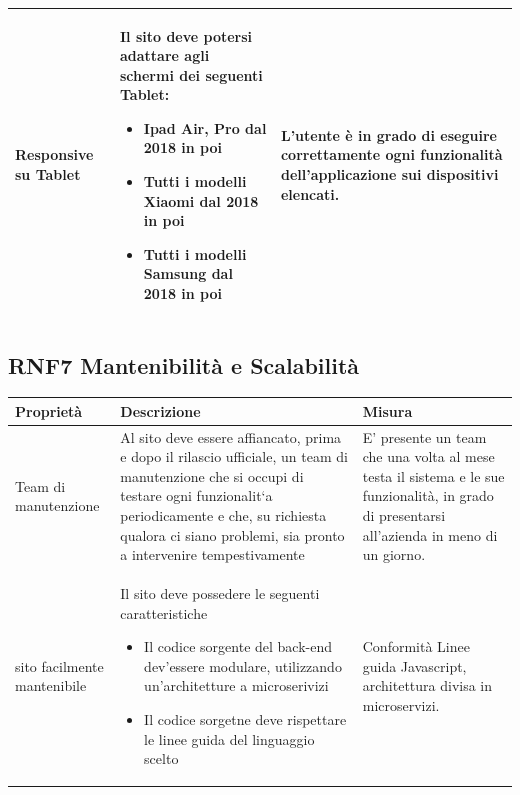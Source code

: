 \documentclass{report}
\begin{document}
\begin{center} %
	\centering
	\begin{tabular}{ |p{3cm}|p{4cm}|p{4cm}|  }
		\hline
		Responsive su Tablet & Il sito deve potersi adattare agli schermi dei seguenti Tablet: 
		\begin{itemize}
			\item Ipad Air, Pro dal 2018 in poi
			\item Tutti i modelli Xiaomi dal 2018 in poi
			\item Tutti i modelli Samsung dal 2018 in poi
		\end{itemize} & L'utente è in grado di eseguire correttamente ogni funzionalità dell'applicazione sui dispositivi elencati. \\
		\hline
		
		
	\end{tabular}
\end{center}
\subsection*{RNF7 Mantenibilità e Scalabilità}
\begin{center} %
	\centering
	\begin{tabular}{ |p{3cm}|p{4cm}|p{4cm}|  }
		\hline
		\centering Proprietà & \qquad\quad Descrizione & \qquad\qquad Misura\\ %
		\hline
		Team di manutenzione &  Al sito deve essere affiancato, prima e dopo il rilascio ufficiale, un team di
		manutenzione che si occupi di testare ogni funzionalit`a periodicamente e
		che, su richiesta qualora ci siano problemi, sia pronto a intervenire tempestivamente
		 & E' presente un team che una volta al mese testa il sistema e le sue funzionalità, in grado di presentarsi all'azienda in meno di un giorno. \\
		\hline
		sito facilmente mantenibile & Il sito deve possedere le seguenti caratteristiche
		\begin{itemize}
			\item Il codice sorgente del back-end dev'essere modulare, utilizzando un'architetture a microserivizi
			\item Il codice sorgetne deve rispettare le linee guida del linguaggio scelto
		\end{itemize}
		& Conformità Linee guida Javascript, architettura divisa in microservizi.
		\\  \hline

	\end{tabular}
\end{center}
\end{document}
